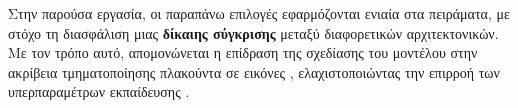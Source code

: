 Στην παρούσα εργασία, οι παραπάνω επιλογές εφαρμόζονται ενιαία στα πειράματα, με στόχο τη διασφάλιση μιας \textbf{δίκαιης σύγκρισης} μεταξύ διαφορετικών αρχιτεκτονικών. Με τον τρόπο αυτό, απομονώνεται η επίδραση της σχεδίασης του μοντέλου στην ακρίβεια τμηματοποίησης πλακούντα σε εικόνες , ελαχιστοποιώντας την επιρροή των υπερπαραμέτρων εκπαίδευσης \cite{cardoso2022monai}.
